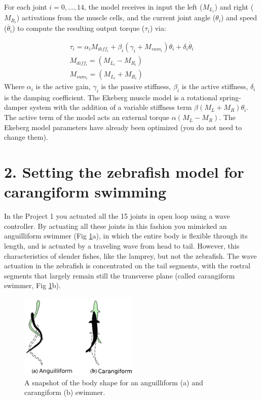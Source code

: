 \documentclass{cmc}
\begin{document}
For each joint $i=0,...,14$, the model receives in input the left ($M_{L_i}$) and right ($M_{R_i}$)
activations from the muscle cells, and the current joint angle ($\theta_i$) and speed ($\Dot{\theta_i}$)
to compute the resulting output torque ($\tau_i$) via:

\begin{eqnarray}
\label{eq:electro_mechanical}
	\tau_i = \alpha_i M_{diff_i} + \beta_i(\gamma_i +M_{sum_i} )\theta_i + \delta_i \Dot{\theta_i} \\
    M_{diff_i} = (M_{L_i} - M_{R_i}) \\
    M_{sum_i} = (M_{L_i} + M_{R_i})
\end{eqnarray}
Where $\alpha_i$ is the active gain, $\gamma_i$ is the passive stiffness, $\beta_i$ is the active stiffness, $\delta_i$ is the damping coefficient. The Ekeberg muscle model is a rotational spring-damper system with the addition of a variable stiffness term $\beta (M_L+M_R) \theta_i$. The active term of the model acts an external torque $\alpha(M_L-M_R)$. The Ekeberg model parameters have already been optimized (you do not need to change them).


\section*{2. Setting the zebrafish model for carangiform swimming}\label{sec:carangiform}
In the Project 1 you actuated all the 15 joints in open loop using a wave controller. By actuating all these joints in this fashion you mimicked an anguilliform swimmer (Fig \ref{fig:carangiform}a), in which the entire body is flexible through its length, and is actuated by a traveling wave from head to tail. However, this characteristics of slender fishes, like the lamprey, but not the zebrafish. The wave actuation in the zebrafish is concentrated on the tail segments, with the rostral segments that largely remain still the transverse plane (called carangiform swimmer, Fig \ref{fig:carangiform}b).

\begin{figure}[ht]
  \centering \includegraphics[width=0.5\textwidth]{figures/carangiform.png}
  \caption{\label{fig:carangiform} A snapshot of the body shape for an anguilliform (a) and carangiform (b) swimmer.}
\end{figure}
\end{document}
